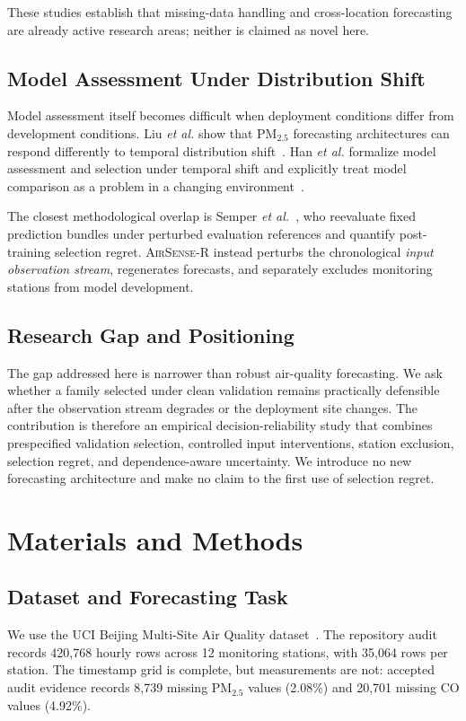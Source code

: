 \documentclass[journal]{IEEEtran}
\newcommand{\AirSense}{\textsc{AirSense-R}}
\begin{document}
These studies establish that missing-data handling and cross-location forecasting are already active research areas; neither is claimed as novel here.

\subsection{Model Assessment Under Distribution Shift}
Model assessment itself becomes difficult when deployment conditions differ from development conditions. Liu \emph{et al.} show that PM$_{2.5}$ forecasting architectures can respond differently to temporal distribution shift~\cite{liu2024distshift}. Han \emph{et al.} formalize model assessment and selection under temporal shift and explicitly treat model comparison as a problem in a changing environment~\cite{han2024selection}.

The closest methodological overlap is Semper \emph{et al.}~\cite{semper2026dss}, who reevaluate fixed prediction bundles under perturbed evaluation references and quantify post-training selection regret. \AirSense{} instead perturbs the chronological \emph{input observation stream}, regenerates forecasts, and separately excludes monitoring stations from model development.

\subsection{Research Gap and Positioning}
The gap addressed here is narrower than robust air-quality forecasting. We ask whether a family selected under clean validation remains practically defensible after the observation stream degrades or the deployment site changes. The contribution is therefore an empirical decision-reliability study that combines prespecified validation selection, controlled input interventions, station exclusion, selection regret, and dependence-aware uncertainty. We introduce no new forecasting architecture and make no claim to the first use of selection regret.

\section{Materials and Methods}
\subsection{Dataset and Forecasting Task}
We use the UCI Beijing Multi-Site Air Quality dataset~\cite{uci_beijing}. The repository audit records 420,768 hourly rows across 12 monitoring stations, with 35,064 rows per station. The timestamp grid is complete, but measurements are not: accepted audit evidence records 8,739 missing PM$_{2.5}$ values (2.08\%) and 20,701 missing CO values (4.92\%).
\end{document}
